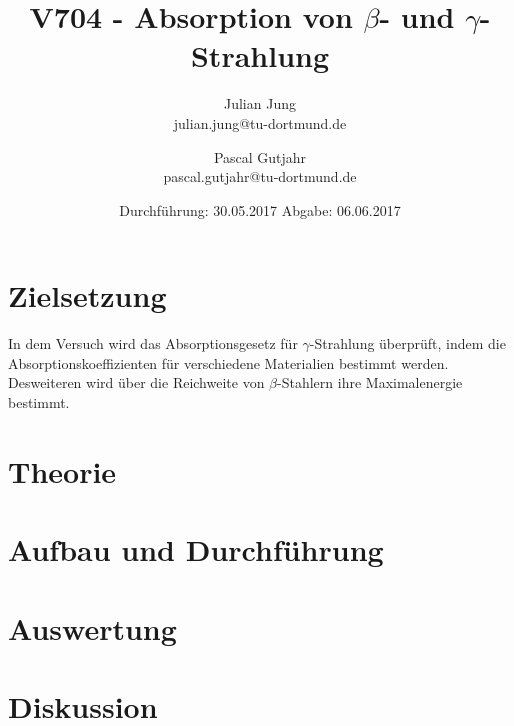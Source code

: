 

\title{V704 - Absorption von $\beta$- und $\gamma$-Strahlung}
\author{Julian Jung \\ julian.jung@tu-dortmund.de
  \and Pascal Gutjahr \\ pascal.gutjahr@tu-dortmund.de}
  \date{Durchführung: 30.05.2017
  \hspace{3em}
  Abgabe: 06.06.2017}
  
\maketitle
\newpage
\tableofcontents
\newpage
\section{Zielsetzung}
In dem Versuch wird das Absorptionsgesetz für $\gamma$-Strahlung überprüft,
indem die Absorptionskoeffizienten für verschiedene Materialien bestimmt werden.
Desweiteren wird über die Reichweite von $\beta$-Stahlern ihre Maximalenergie
bestimmt.
\section{Theorie}
 
\section{Aufbau und Durchführung}
 
\section{Auswertung}
 
\section{Diskussion}

\printbibliography

